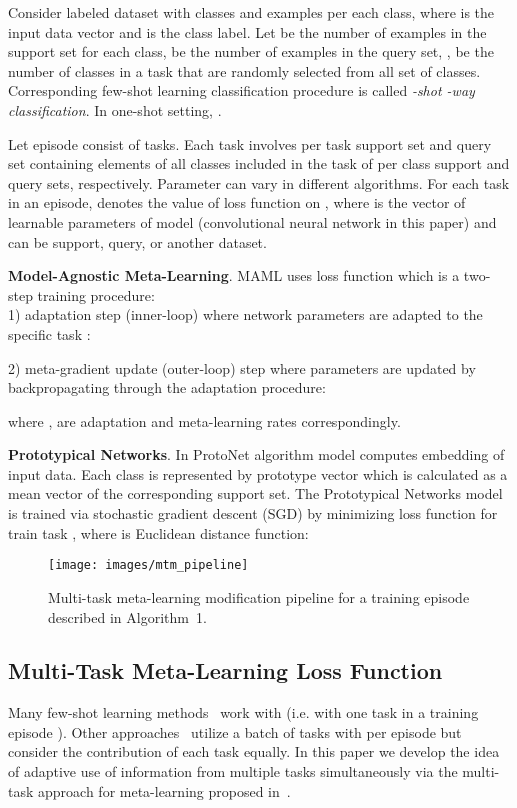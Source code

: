 \documentclass{article}
\begin{document}
Consider labeled dataset  with  classes and  examples per each class, where  is the input data vector and  is the class label. Let  be the number of examples in the support set for each class,  be the number of examples in the query set, ,  be the number of classes in a task that are randomly selected from all set of  classes. Corresponding few-shot learning classification procedure is called {\it -shot -way classification}. In one-shot setting, .

Let episode  consist of  tasks. Each task  
involves per task support set  and query set  containing elements of all  classes included in the task  of per class support and query sets, respectively. Parameter  can vary in different algorithms. For each task  in an episode,  denotes the value of loss function on , where  is the vector of learnable parameters of model  (convolutional neural network in this paper) and  can be support, query, or another dataset. 

{\bf Model-Agnostic Meta-Learning}. MAML uses loss function which is a two-step training procedure: \\1) adaptation step (inner-loop) where network parameters are adapted to the specific task :

2) meta-gradient update (outer-loop) step where parameters  are updated by backpropagating through the adaptation procedure: 
 
where ,  are adaptation and meta-learning rates correspondingly.

{\bf Prototypical Networks}. In ProtoNet algorithm model  computes embedding of input data. Each class  is represented by prototype vector  which is calculated as a mean vector of the corresponding support set. The Prototypical Networks model  is trained via stochastic gradient descent (SGD) by minimizing loss function for train task , where  is Euclidean distance function:

\begin{figure*}[t]
  \centering
  \texttt{[image: images/mtm\_pipeline]}
  \caption{Multi-task meta-learning modification pipeline for a training episode  described in Algorithm~1.}
  \label{fig:mtm_pipeline}
\end{figure*}

\subsection{Multi-Task Meta-Learning Loss Function}

Many few-shot learning methods~\cite{vinyals2016matching,NIPS2017_cb8da676,8954109} work with  (i.e. with one task in a training episode ). Other approaches~\cite{finn2017model,mishra2017simple} utilize a batch of tasks with  per episode but consider the contribution of each task equally. In this paper we develop the idea of adaptive use of information from multiple tasks simultaneously via the multi-task approach for meta-learning proposed in~\cite{boiarov2020simultaneous}.
\end{document}
